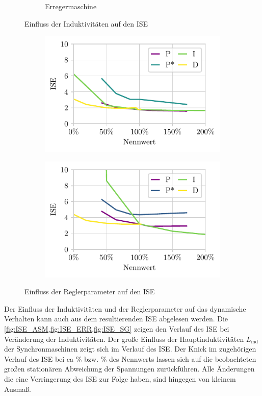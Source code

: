 \begin{figure}
\begin{subfigure}{\textwidth}
        \caption{Erregermaschine }
        \label{fig:ISE_ERR}    
    \end{subfigure}
    \caption{Einfluss der Induktivitäten auf den ISE}
\end{figure}
\begin{figure}
    \centering
    \begin{subfigure}{.49\linewidth}
        \centering
        \includegraphics{Bilder/regler_ISE.pdf}    
    \end{subfigure}
    \begin{subfigure}{.49\linewidth}
        \centering
        \includegraphics{Bilder/simulation_reglerSweep.pdf}
    \end{subfigure}
    \caption{Einfluss der Reglerparameter auf den ISE}
    \label{fig:ISE_ReglerSweep}
\end{figure}

Der Einfluss der Induktivitäten und der Reglerparameter auf das dynamische Verhalten kann auch aus dem resultierenden ISE abgelesen werden. Die \cref{fig:ISE_ASM,fig:ISE_ERR,fig:ISE_SG} zeigen den Verlauf des ISE bei Veränderung der Induktivitäten. Der große Einfluss der Hauptinduktivitäten $L_{\mathrm{md}}$ der Synchronmaschinen zeigt sich im Verlauf des ISE. Der Knick im zugehörigen Verlauf des ISE bei ca \unit[48]{\%} bzw. \unit[33]{\%} des Nennwerts lassen sich auf die beobachteten großen stationären Abweichung der Spannungen zurückführen. Alle Änderungen die eine Verringerung des ISE zur Folge haben, sind hingegen von kleinem Ausmaß.

